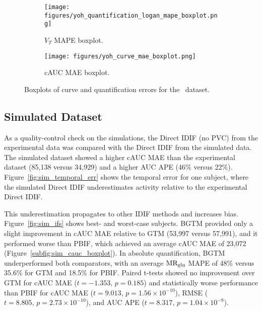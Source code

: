 \begin{figure}[h]
	\centering
	\begin{subfigure}[b]{0.45\textwidth}
		\texttt{[image: figures/yoh\_quantification\_logan\_mape\_boxplot.png]}
		\caption{\(V_T\) MAPE boxplot.}
		\label{subfig:yoh_mape_boxplot}
	\end{subfigure}
	\begin{subfigure}[b]{0.45\textwidth}
		\texttt{[image: figures/yoh\_curve\_mae\_boxplot.png]}
		\caption{cAUC MAE boxplot.}
		\label{subfig:yoh_cauc_boxplot}
	\end{subfigure}
	\caption{Boxplots of curve and quantification errors for the \yohimbine\ dataset.}
	\label{fig:yoh_boxplots}
\end{figure}

\subsection{Simulated Dataset}
As a quality-control check on the simulations, the Direct IDIF (no PVC) from the experimental data was compared with the Direct IDIF from the simulated data.
The simulated dataset showed a higher cAUC MAE than the experimental dataset (85{,}138 versus 34{,}929) and a higher AUC APE (46\% versus 22\%).
Figure~\ref{fig:sim_temporal_err} shows the temporal error for one subject, where the simulated Direct IDIF underestimates activity relative to the experimental Direct IDIF.

This underestimation propagates to other IDIF methods and increases bias.
Figure~\ref{fig:sim_ifs} shows best- and worst-case subjects.
BGTM provided only a slight improvement in cAUC MAE relative to GTM (53{,}997 versus 57{,}991), and it performed worse than PBIF, which achieved an average cAUC MAE of 23{,}072 (Figure~\ref{subfig:sim_cauc_boxplot}).
In absolute quantification, BGTM underperformed both comparators, with an average \(\text{MR}_{\text{glu}}\) MAPE of 48\% versus 35.6\% for GTM and 18.5\% for PBIF.
Paired t-tests showed no improvement over GTM for cAUC MAE (\(t=-1.353,\,p=0.185\)) and statistically worse performance than PBIF for cAUC MAE (\(t=9.013,\,p=1.56\times10^{-10}\)), RMSE (\(t=8.805,\,p=2.73\times10^{-10}\)), and AUC APE (\(t=8.317,\,p=1.04\times10^{-9}\)).


